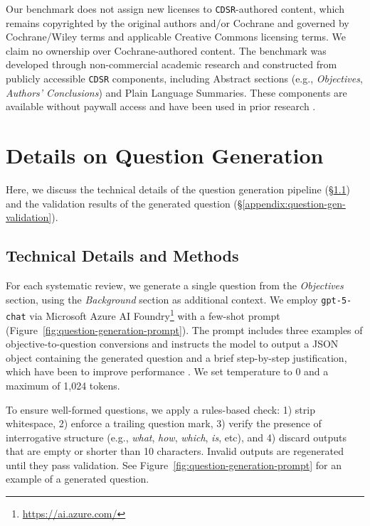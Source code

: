 \documentclass{article}
\begin{document}
Our benchmark does not assign new licenses to \texttt{CDSR}-authored content, which remains copyrighted by the original authors and/or Cochrane and governed by Cochrane/Wiley terms and applicable Creative Commons licensing terms. We claim no ownership over Cochrane-authored content. The benchmark was developed through non-commercial academic research and constructed from publicly accessible \texttt{CDSR} components, including Abstract sections (e.g., \textit{Objectives}, \textit{Authors’ Conclusions}) and Plain Language Summaries. These components are available without paywall access and have been used in prior research \cite{bakker-kamps-2024-cochrane, DEVANE2025111894, polzak2025can}.

\newpage

\section{Details on Question Generation}
Here, we discuss the technical details of the question generation pipeline (\S \ref{appendix:question-gen-technical}) and the validation results of the generated question (\S \ref{appendix:question-gen-validation}).

\subsection{Technical Details and Methods}\label{appendix:question-gen-technical}

For each systematic review, we generate a single question from the \textit{Objectives} section, using the \textit{Background} section as additional context. We employ \texttt{gpt-5-chat} via Microsoft Azure AI Foundry\footnote{\url{https://ai.azure.com/}} with a few-shot prompt (Figure~\ref{fig:question-generation-prompt}). The prompt includes three examples of objective-to-question conversions and instructs the model to output a JSON object containing the generated question and a brief step-by-step justification, which have been to improve performance \cite{dammu-etal-2024-uncultured, wei2022chain}. We set temperature to 0 and a maximum of 1{,}024 tokens.

To ensure well-formed questions, we apply a rules-based check: 1) strip whitespace, 2) enforce a trailing question mark, 3) verify the presence of interrogative structure (e.g., \textit{what}, \textit{how}, \textit{which}, \textit{is}, etc), and 4) discard outputs that are empty or shorter than 10 characters. Invalid outputs are regenerated until they pass validation. See Figure~\ref{fig:question-generation-prompt} for an example of a generated question.
\end{document}
